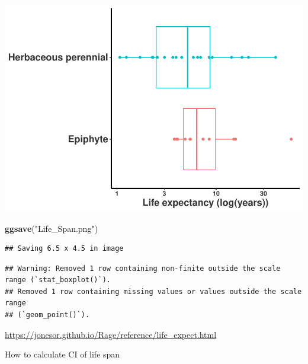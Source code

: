 \documentclass[
]{book}
\newenvironment{Shaded}{\begin{snugshade}}{\end{snugshade}}
\newcommand{\FunctionTok}[1]{\textcolor[rgb]{0.13,0.29,0.53}{\textbf{#1}}}
\newcommand{\NormalTok}[1]{#1}
\newcommand{\StringTok}[1]{\textcolor[rgb]{0.31,0.60,0.02}{#1}}
\theoremstyle{definition}
\theoremstyle{definition}
\theoremstyle{definition}
\theoremstyle{definition}
\theoremstyle{remark}
\begin{document}
\includegraphics{Diagnostico_Poblacional_files/figure-latex/unnamed-chunk-29-1.pdf}

\begin{Shaded}
\begin{Highlighting}[]
\FunctionTok{ggsave}\NormalTok{(}\StringTok{"Life\_Span.png"}\NormalTok{)}
\end{Highlighting}
\end{Shaded}

\begin{verbatim}
## Saving 6.5 x 4.5 in image
\end{verbatim}

\begin{verbatim}
## Warning: Removed 1 row containing non-finite outside the scale range (`stat_boxplot()`).
## Removed 1 row containing missing values or values outside the scale range
## (`geom_point()`).
\end{verbatim}

\url{https://jonesor.github.io/Rage/reference/life_expect.html}

How to calculate CI of life span
\end{document}
